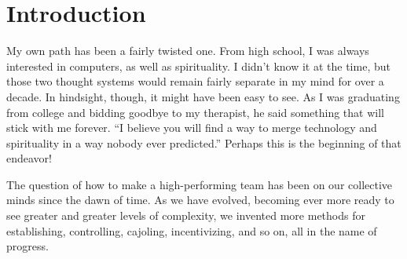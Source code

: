 \chapter{Introduction}

My own path has been a fairly twisted one. From high school, I was always interested in computers, as well as
spirituality. I didn't know it at the time, but those two thought systems would remain fairly separate in my mind
for over a decade. In hindsight, though, it might have been easy to see. As I was graduating from college
and bidding goodbye to my therapist, he said something that will stick with me forever. ``I believe you will find
a way to merge technology and spirituality in a way nobody ever predicted.'' Perhaps this is the beginning
of that endeavor!

The question of how to make a high-performing team has been on our collective minds since the dawn of time.
As we have evolved, becoming ever more ready to see greater and greater levels of complexity, we invented
more methods for establishing, controlling, cajoling, incentivizing, and so on, all in the name of progress.